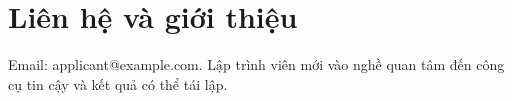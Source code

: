 \section{Liên hệ và giới thiệu}
Email: applicant@example.com. Lập trình viên mới vào nghề quan tâm đến công cụ tin cậy và kết quả có thể tái lập.

